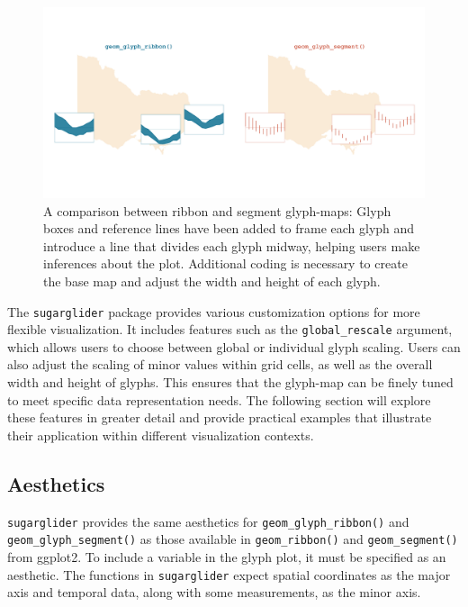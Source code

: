 \begin{figure}
\includegraphics[width=50in]{figures/ribbon_segment} \caption{A comparison between ribbon and segment glyph-maps: Glyph boxes and reference lines have been added to frame each glyph and introduce a line that divides each glyph midway, helping users make inferences about the plot. Additional coding is necessary to create the base map and adjust the width and height of each glyph.}\label{fig:comparisonPlot}
\end{figure}

The \texttt{sugarglider} package provides various customization options for more flexible visualization. It includes features such as the \texttt{global\_rescale} argument, which allows users to choose between global or individual glyph scaling. Users can also adjust the scaling of minor values within grid cells, as well as the overall width and height of glyphs. This ensures that the glyph-map can be finely tuned to meet specific data representation needs. The following section will explore these features in greater detail and provide practical examples that illustrate their application within different visualization contexts.

\hypertarget{aesthetics}{%
\subsection{Aesthetics}\label{aesthetics}}

\texttt{sugarglider} provides the same aesthetics for \texttt{geom\_glyph\_ribbon()} and \texttt{geom\_glyph\_segment()} as those available in \texttt{geom\_ribbon()} and \texttt{geom\_segment()} from ggplot2. To include a variable in the glyph plot, it must be specified as an aesthetic. The functions in \texttt{sugarglider} expect spatial coordinates as the major axis and temporal data, along with some measurements, as the minor axis.

